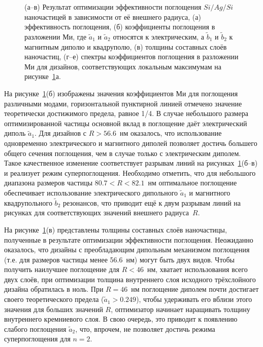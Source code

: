 \begin{figure}[t]
  \begin{minipage}[ht]{0.495\linewidth}
  \end{minipage}
  \hfill
  \begin{minipage}[ht]{0.495\linewidth}
  \end{minipage}
  \caption{ (а--в) Результат оптимизации эффективности поглощения
    $Si/Ag/Si$ наночастицей в зависимости от её внешнего радиуса, (а)
    эффективность поглощения, (б) коэффициенты поглощения в разложении
    Ми, где $\tilde{a}_1$ и $\tilde{a}_2$ относятся к электрическим, а
    $\tilde{b}_1$ и $\tilde{b}_2$ к магнитным диполю и квадруполю, (в)
    толщины составных слоёв наночастиц, (г--е) спектры коэффициентов
    поглощения в разложении Ми для дизайнов, соответствующих локальным
    максимумам на рисунке~\ref{img:q-abs}а.}
  \label{img:q-abs}  
\end{figure}


На рисунке~\ref{img:q-abs}(б) изображены значения коэффициентов Ми для
поглощения различными модами, горизонтальной пунктирной линией
отмечено значение теоретически достижимого предела, равное 1/4. В
случае небольшого размера оптимизированной частицы основной вклад в
поглощение даёт электрический диполь $\tilde{a}_1$.  Для дизайнов с
$R > 56.6$~нм оказалось, что использование одновременно электрического
и магнитного диполей позволяет достичь большего общего сечения
поглощения, чем в случае только с электрическим
диполем. Такое качественное изменение соответствует разрывам линий на
рисунках~\ref{img:q-abs}(б--в) и реализует режим суперпоглощения.
Необходимо отметить, что для небольшого диапазона размеров частицы
$80.7<R<82.1$~нм оптимальное поглощение обеспечивает использование
электрического дипольного $\tilde{a}_1$ и магнитного квадрупольного
$\tilde{b}_2$ резонансов, что приводит ещё к двум разрывам линий на
рисунках для соответствующих значений внешнего радиуса~$R$.

На рисунке~\ref{img:q-abs}(в) представлены толщины составных слоёв
наночастицы, полученные в результате оптимизации эффективности
поглощения.  Неожиданно оказалось, что дизайны с преобладающим
дипольным механизмом поглощения (т.е. для размеров частицы менее
56.6~нм) могут быть двух видов.  Чтобы получить наилучшее поглощение
для $R<46$~нм, хватает использования всего двух слоёв, при оптимизации
толщина внутреннего слоя исходного трёхслойного дизайна обратилась в
ноль.  При $R=46$~нм поглощение диполем почти достигает своего
теоретического предела ($\tilde{a}_1>0.249$), чтобы удерживать его
вблизи этого значения для больших значений $R$, оптимизатор начинает
наращивать толщину внутреннего кремниевого слоя.  В свою очередь, это
приводит к появлению слабого поглощения  $\tilde{a}_2$,
что, впрочем, не позволяет достичь режима суперпоглощения для $n=2$.


